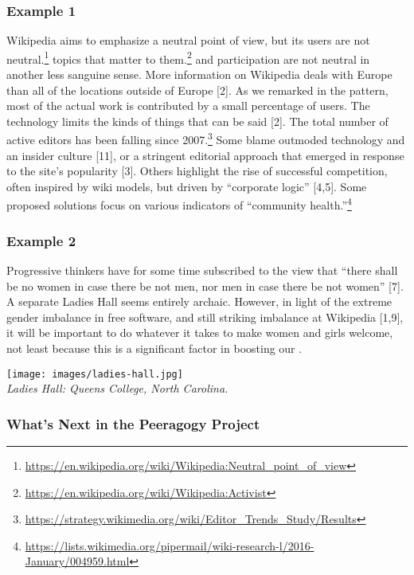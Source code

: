 \hypertarget{example-1}{%
\subsubsection{Example 1}\label{example-1}}

Wikipedia aims to emphasize a neutral point of view, but its users are
not neutral.\footnote{\url{https://en.wikipedia.org/wiki/Wikipedia:Neutral_point_of_view}}
topics that matter to them.\footnote{\url{https://en.wikipedia.org/wiki/Wikipedia:Activist}}
and participation are not neutral in another less sanguine sense. More
information on Wikipedia deals with Europe than all of the locations
outside of Europe {{[}2{]}}. As we remarked in the pattern, most of the
actual work is contributed by a small percentage of users. The
technology limits the kinds of things that can be said {{[}2{]}}. The
total number of active editors has been falling since 2007.\footnote{\url{https://strategy.wikimedia.org/wiki/Editor_Trends_Study/Results}}
Some blame outmoded technology and an insider culture {{[}11{]}}, or a
stringent editorial approach that emerged in response to the site's
popularity {{[}3{]}}. Others highlight the rise of successful
competition, often inspired by wiki models, but driven by ``corporate
logic'' {{[}4,5{]}}. Some proposed solutions focus on various indicators
of ``community health.''\footnote{\url{https://lists.wikimedia.org/pipermail/wiki-research-l/2016-January/004959.html}}

\hypertarget{example-2}{%
\subsubsection{Example 2}\label{example-2}}

Progressive thinkers have for some time subscribed to the view that
``there shall be no women in case there be not men, nor men in case
there be not women'' {{[}7{]}}. A separate Ladies Hall seems entirely
archaic. However, in light of the extreme gender imbalance in free
software, and still striking imbalance at Wikipedia {{[}1,9{]}}, it will
be important to do whatever it takes to make women and girls welcome,
not least because this is a significant factor in boosting our .

\texttt{[image: images/ladies-hall.jpg]}\\
\emph{Ladies Hall: Queens College, North Carolina.}

\hypertarget{whats-next-in-the-peeragogy-project}{%
\subsubsection{What's Next in the Peeragogy
Project}\label{whats-next-in-the-peeragogy-project}}

